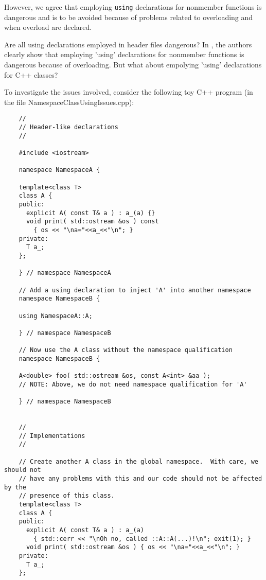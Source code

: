 {}\noindent{}However, we agree that employing {}\texttt{using} declarations
for nonmember functions is dangerous and is to be avoided because of problems
related to overloading and when overload are declared.

Are all using declarations employed in header files dangerous?  In
{}\cite[Item 59]{C++CodingStandards05}, the authors clearly show that
employing 'using' declarations for nonmember functions is dangerous because of
overloading.  But what about empolying 'using' declarations for C++ classes?

To investigate the issues involved, consider the following toy C++ program (in
the file NamespaceClassUsingIssues.cpp):

{\small\begin{verbatim}
    //
    // Header-like declarations
    //
    
    #include <iostream>
    
    namespace NamespaceA {
    
    template<class T>
    class A {
    public:
      explicit A( const T& a ) : a_(a) {}
      void print( std::ostream &os ) const
        { os << "\na="<<a_<<"\n"; }
    private:
      T a_;
    };
    
    } // namespace NamespaceA
    
    // Add a using declaration to inject 'A' into another namespace
    namespace NamespaceB {
    
    using NamespaceA::A;
    
    } // namespace NamespaceB
    
    // Now use the A class without the namespace qualification
    namespace NamespaceB {
    
    A<double> foo( std::ostream &os, const A<int> &aa );
    // NOTE: Above, we do not need namespace qualification for 'A'
    
    } // namespace NamespaceB
    
    
    //
    // Implementations
    //
    
    // Create another A class in the global namespace.  With care, we should not
    // have any problems with this and our code should not be affected by the
    // presence of this class.
    template<class T>
    class A {
    public:
      explicit A( const T& a ) : a_(a) 
        { std::cerr << "\nOh no, called ::A::A(...)!\n"; exit(1); }
      void print( std::ostream &os ) { os << "\na="<<a_<<"\n"; }
    private:
      T a_;
    };
    

\end{verbatim}}
